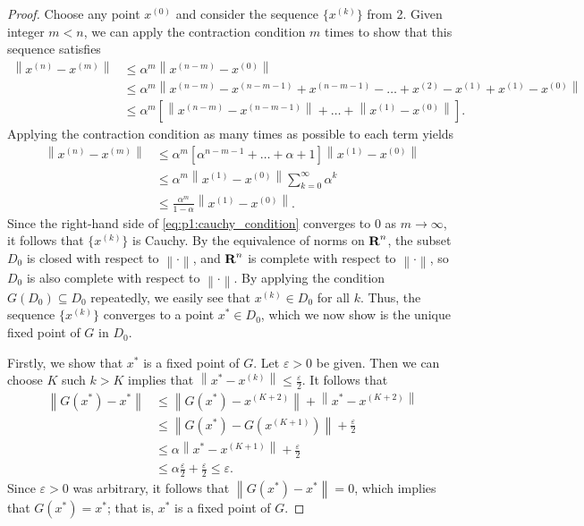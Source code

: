 \documentclass{homework}
\newcommand{\pow}[1]{^{\left(#1\right)}}
\newcommand{\norm}[1]{\left\lVert{#1}\right\rVert}
\begin{document}
	\begin{proof}
		Choose any point $x\pow{0}$ and consider the sequence $\big\{x\pow{k}\big\}$ from 2. Given integer $m<n$, we can apply the contraction condition $m$ times to show that this sequence satisfies
		\begin{equation*}
		\begin{aligned}
			\norm{x\pow{n} - x\pow{m}} &\le \alpha^{m}\norm{x\pow{n-m} - x\pow{0}} \\
			& \le \alpha^{m} \norm{x\pow{n-m} - x\pow{n-m-1} + x\pow{n-m-1} -\dots + x\pow{2} - x\pow{1} + x\pow{1} - x\pow{0}} \\
			&\le \alpha^{m}\left[\norm{x\pow{n-m} - x\pow{n-m-1}} + \dots + \norm{x\pow{1}- x\pow{0}}\right].
		\end{aligned}
		\end{equation*}
		Applying the contraction condition as many times as possible to each term yields
		\begin{equation}
		\label{eq:p1:cauchy_condition}
		\begin{aligned}
			\norm{x\pow{n} - x\pow{m}} &\le \alpha^{m}\left[\alpha^{n-m-1} + \dots + \alpha + 1\right]\norm{x\pow{1} - x\pow{0}} \\
			&\le \alpha^{m}\norm{x\pow{1} - x\pow{0}}\sum_{k=0}^\infty \alpha^k \\
			& \le \frac{\alpha^{m}}{1-\alpha}\norm{x\pow{1} - x\pow{0}}.
		\end{aligned}
		\end{equation}
		Since the right-hand side of \eqref{eq:p1:cauchy_condition} converges to 0 as $m \to \infty$, it follows that $\big\{x\pow{k}\big\}$ is Cauchy. By the equivalence of norms on $\textbf{R}^n$, the subset $D_0$ is closed with respect to $\norm{\cdot}$, and $\textbf{R}^n$ is complete with respect to $\norm{\cdot}$, so $D_0$ is also complete with respect to $\norm{\cdot}$. By applying the condition $G(D_0) \subseteq D_0$ repeatedly, we easily see that $x\pow{k} \in D_0$ for all $k$. Thus, the sequence $\big\{x\pow{k}\big\}$ converges to a point $x^* \in D_0$, which we now show is the unique fixed point of $G$ in $D_0$.
		
		Firstly, we show that $x^*$ is a fixed point of $G$. Let $\varepsilon > 0$ be given. Then we can choose $K$ such $k > K$ implies that $\norm{x^* - x\pow{k}}\le \frac{\varepsilon}{2}$. It follows that
		\begin{equation*}
		\begin{aligned}
			\norm{G(x^*) - x^*} &\le \norm{G(x^*) - x\pow{K+2}} + \norm{x^* - x\pow{K+2}} \\
			&\le \norm{G(x^*) - G\left(x\pow{K+1}\right)} + \frac{\varepsilon}{2} \\
			&\le \alpha\norm{x^* - x\pow{K+1}} + \frac{\varepsilon}{2} \\
			&\le \alpha\frac{\varepsilon}{2} + \frac{\varepsilon}{2} \le \varepsilon.
		\end{aligned}
		\end{equation*}
		Since $\varepsilon > 0$ was arbitrary, it follows that $\norm{G(x^*) - x^*} = 0$, which implies that $G(x^*) = x^*$; that is, $x^*$ is a fixed point of $G$.
		

\end{proof}
\end{document}
